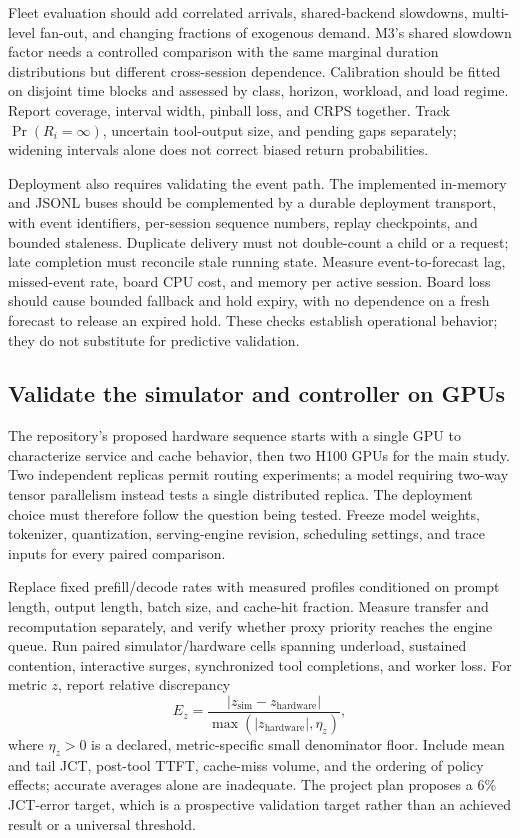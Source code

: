 \documentclass[11pt,a4paper]{article}
\begin{document}
Fleet evaluation should add correlated arrivals, shared-backend slowdowns, multi-level fan-out, and changing fractions of exogenous demand. M3's shared slowdown factor needs a controlled comparison with the same marginal duration distributions but different cross-session dependence. Calibration should be fitted on disjoint time blocks and assessed by class, horizon, workload, and load regime. Report coverage, interval width, pinball loss, and CRPS together. Track \(\Pr(R_i=\infty)\), uncertain tool-output size, and pending gaps separately; widening intervals alone does not correct biased return probabilities.

Deployment also requires validating the event path. The implemented in-memory and JSONL buses should be complemented by a durable deployment transport, with event identifiers, per-session sequence numbers, replay checkpoints, and bounded staleness. Duplicate delivery must not double-count a child or a request; late completion must reconcile stale running state. Measure event-to-forecast lag, missed-event rate, board CPU cost, and memory per active session. Board loss should cause bounded fallback and hold expiry, with no dependence on a fresh forecast to release an expired hold. These checks establish operational behavior; they do not substitute for predictive validation.

\subsection{Validate the simulator and controller on GPUs}
The repository's proposed hardware sequence starts with a single GPU to characterize service and cache behavior, then two H100 GPUs for the main study. Two independent replicas permit routing experiments; a model requiring two-way tensor parallelism instead tests a single distributed replica. The deployment choice must therefore follow the question being tested. Freeze model weights, tokenizer, quantization, serving-engine revision, scheduling settings, and trace inputs for every paired comparison.

Replace fixed prefill/decode rates with measured profiles conditioned on prompt length, output length, batch size, and cache-hit fraction. Measure transfer and recomputation separately, and verify whether proxy priority reaches the engine queue. Run paired simulator/hardware cells spanning underload, sustained contention, interactive surges, synchronized tool completions, and worker loss. For metric \(z\), report relative discrepancy
\begin{equation}
E_z=\frac{|z_{\mathrm{sim}}-z_{\mathrm{hardware}}|}{\max(|z_{\mathrm{hardware}}|,\eta_z)},
\end{equation}
where \(\eta_z>0\) is a declared, metric-specific small denominator floor. Include mean and tail JCT, post-tool TTFT, cache-miss volume, and the ordering of policy effects; accurate averages alone are inadequate. The project plan proposes a 6\% JCT-error target, which is a prospective validation target rather than an achieved result or a universal threshold.
\end{document}
